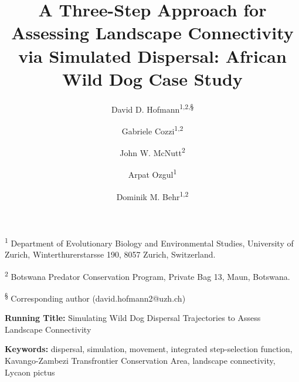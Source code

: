 \documentclass[abstract=on,10pt,a4paper,bibliography=totocnumbered]{article}
\title{A Three-Step Approach for Assessing Landscape Connectivity via Simulated
Dispersal: African Wild Dog Case Study}
\author{
  David D. Hofmann\textsuperscript{1,2,\S} \orcid{0000-0003-3477-4365} \and
  Gabriele Cozzi\textsuperscript{1,2} \orcid{0000-0002-1744-1940} \and
  John W. McNutt\textsuperscript{2} \and
  Arpat Ozgul\textsuperscript{1} \orcid{0000-0001-7477-2642} \and
  Dominik M. Behr\textsuperscript{1,2} \orcid{0000-0001-7378-8538}
}
\begin{document}



\maketitle

\begin{flushleft}

\vspace{0.5cm}

\textsuperscript{1} Department of Evolutionary Biology and Environmental
Studies, University of Zurich, Winterthurerstarsse 190, 8057 Zurich,
Switzerland.

\textsuperscript{2} Botswana Predator Conservation Program, Private Bag 13,
Maun, Botswana.

\textsuperscript{\S} Corresponding author (david.hofmann2@uzh.ch)

\vspace{4cm}

\textbf{Running Title:} Simulating Wild Dog Dispersal Trajectories to Assess
Landscape Connectivity

\vspace{0.5cm}

\textbf{Keywords:} dispersal, simulation, movement, integrated step-selection
function, Kavango-Zambezi Transfrontier Conservation Area, landscape
connectivity, Lycaon pictus

\end{flushleft}
\end{document}
